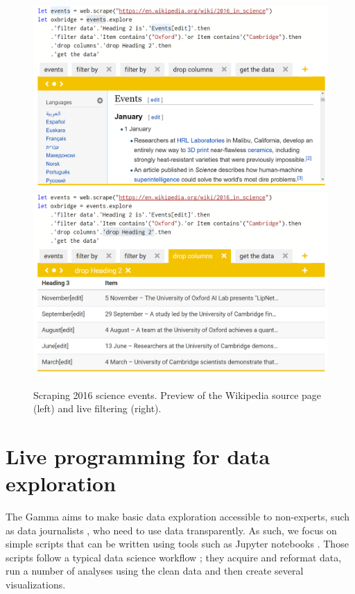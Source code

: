 \documentclass[sigplan,10pt]{acmart}\settopmatter{printfolios=true,printccs=false,printacmref=false}
\theoremstyle{plain}
\theoremstyle{definition}
\begin{document}
\begin{figure}
\includegraphics[scale=0.21]{wiki.png}
\includegraphics[scale=0.21]{drop.png}
\caption{Scraping 2016 science events. Preview of the Wikipedia source page (left) and live filtering (right).}
\label{fig:thegamma}
\end{figure}


\section{Live programming for data exploration}
\label{sec:live}

The Gamma aims to make basic data exploration accessible to non-experts, such as data journalists \cite{ddj}, 
who need to use data transparently. As such, we focus on simple scripts that can be written using
tools such as Jupyter notebooks \cite{jupyter}. Those scripts follow a typical data science workflow \cite{workflow};
they acquire and reformat data, run a number of analyses using the clean data and then create 
several visualizations.
\end{document}
